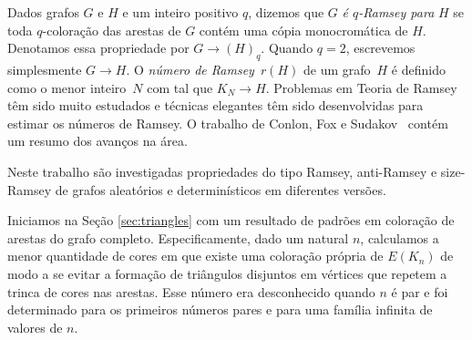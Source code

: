 \documentclass[11pt,twoside,a4paper]{book}
\theoremstyle{note}
\begin{document}
Dados grafos $G$ e $H$ e um inteiro positivo $q$, dizemos que $G$
\emph{é $q$-Ramsey para} $H$ se toda $q$-coloração das arestas de $G$ contém uma cópia monocromática de $H$.
Denotamos essa propriedade por $G\rightarrow (H)_q$.
Quando $q=2$, escrevemos simplesmente $G\rightarrow H$.
O \emph{número de Ramsey}~$r(H)$ de um grafo~$H$ é definido como o menor inteiro~$N$ com tal que $K_N \rightarrow H$.
Problemas em Teoria de Ramsey têm sido muito estudados e técnicas elegantes têm sido desenvolvidas  para estimar os números de Ramsey.
O trabalho de Conlon, Fox e Sudakov~\cite{CoFoSu15} contém um resumo  dos avanços na área.



Neste trabalho 
são investigadas propriedades do tipo Ramsey, anti-Ramsey
e size-Ramsey de grafos aleatórios e determinísticos em diferentes versões. 

Iniciamos na Seção \ref{sec:triangles} com  um resultado de padrões em coloração de arestas do grafo completo. 
Especificamente, dado um natural $n$, calculamos a menor 
quantidade de cores em que existe uma coloração própria de $E(K_n)$ de modo a se evitar a formação de triângulos disjuntos em vértices que repetem a trinca de cores nas arestas.
Esse número era desconhecido quando $n$ é par e foi determinado para os primeiros números pares e para uma família infinita de valores de $n$.

\end{document}
